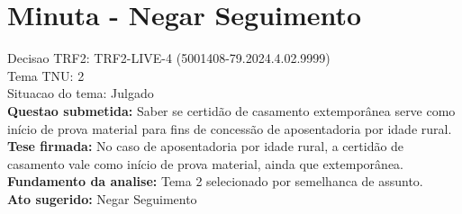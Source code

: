 \documentclass{article}
\begin{document}
\section*{Minuta - Negar Seguimento}
Decisao TRF2: TRF2-LIVE-4 (5001408-79.2024.4.02.9999)\\
Tema TNU: 2\\
Situacao do tema: Julgado\\
\textbf{Questao submetida:} Saber se certidão de casamento extemporânea serve como início de prova material para fins de concessão de aposentadoria por idade rural.\\
\textbf{Tese firmada:} No caso de aposentadoria por idade rural, a certidão de casamento vale como início de prova material, ainda que extemporânea.\\
\textbf{Fundamento da analise:} Tema 2 selecionado por semelhanca de assunto.\\
\textbf{Ato sugerido:} Negar Seguimento
\end{document}
